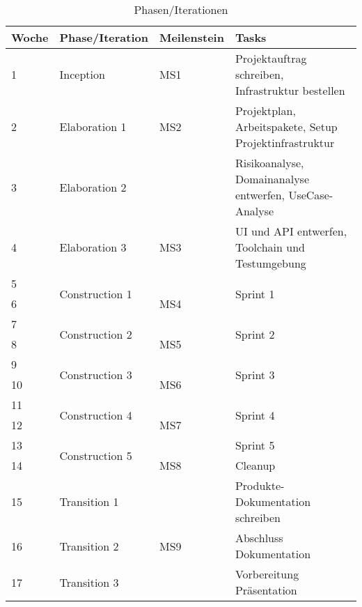 \begin{table}[H]
    \centering
    \caption{Phasen/Iterationen}
    \label{phases}
    \begin{tabular}{| l | l | l | l |}
        \toprule
        Woche & Phase/Iteration                 & Meilenstein & Tasks                                                     \\
        \midrule
        1     & Inception                       & MS1         & Projektauftrag schreiben, Infrastruktur bestellen       \\
        2     & Elaboration 1                   & MS2         & Projektplan, Arbeitspakete, Setup Projektinfrastruktur  \\
        3     & Elaboration 2                   &             & Risikoanalyse, Domainanalyse entwerfen, UseCase-Analyse \\
        4     & Elaboration 3                   & MS3         & UI und API entwerfen, Toolchain und Testumgebung        \\
        5     & \multirow{2}{*}{Construction 1} &             & \multirow{2}{*}{Sprint 1}                               \\
        6     &                                 & MS4         &                                                         \\
        7     & \multirow{2}{*}{Construction 2} &             & \multirow{2}{*}{Sprint 2}                               \\
        8     &                                 & MS5         &                                                         \\
        9     & \multirow{2}{*}{Construction 3} &             & \multirow{2}{*}{Sprint 3}                               \\
        10    &                                 & MS6         &                                                         \\
        11    & \multirow{2}{*}{Construction 4} &             & \multirow{2}{*}{Sprint 4}                               \\
        12    &                                 & MS7         &                                                         \\
        13    & \multirow{2}{*}{Construction 5} &             & Sprint 5                                                \\
        14    &                                 & MS8         & Cleanup                                                 \\
        15    & Transition 1                    &             & Produkte-Dokumentation schreiben                        \\
        16    & Transition 2                    & MS9         & Abschluss Dokumentation                                 \\
        17    & Transition 3                    &             & Vorbereitung Präsentation                               \\
        \bottomrule
    \end{tabular}
\end{table}



